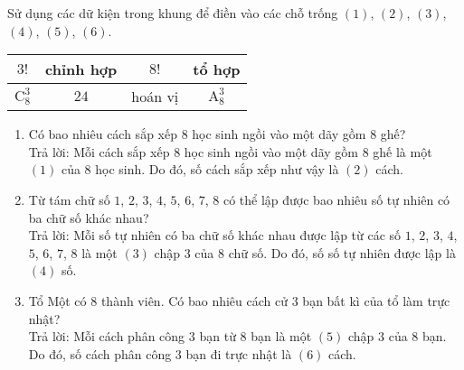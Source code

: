 
\begin{bt}[1,5 điểm]%
	Sử dụng các dữ kiện trong khung để điền vào các chỗ trống $(1)$, $(2)$, $(3)$, $(4)$, $(5)$, $(6)$.
\begin{center}
		\begin{tabular}{|c|c|c|c|}
		\hline
		$3!$ & chỉnh hợp & $8!$ & tổ hợp \\
		\hline
		$\mathrm{C}_8^3$ & $24$ & hoán vị & $\mathrm{A}_8^3$ \\
		\hline
	\end{tabular}
\end{center}
	\begin{enumerate}
		\item Có bao nhiêu cách sắp xếp $8$ học sinh ngồi vào một dãy gồm $8$ ghế?\\
		Trả lời: Mỗi cách sắp xếp $8$ học sinh ngồi vào một dãy gồm $8$ ghế là một $(1)$ của $8$ học sinh. Do đó, số cách sắp xếp như vậy là $(2)$ cách.
		\item Từ tám chữ số $1$, $2$, $3$, $4$, $5$, $6$, $7$, $8$ có thể lập được bao nhiêu số tự nhiên có ba chữ số khác nhau?\\
		Trả lời: Mỗi số tự nhiên có ba chữ số khác nhau được lập từ các số $1$, $2$, $3$, $4$, $5$, $6$, $7$, $8$ là một $(3)$ chập $3$ của $8$ chữ số. Do đó, số số tự nhiên được lập là $(4)$ số.
		\item Tổ Một có $8$ thành viên. Có bao nhiêu cách cử $3$ bạn bất kì của tổ làm trực nhật?\\
		Trả lời: Mỗi cách phân công $3$ bạn từ $8$ bạn là một $(5)$ chập $3$ của $8$ bạn. Do đó, số cách phân công $3$ bạn đi trực nhật là $(6)$ cách.
	\end{enumerate}
\end{bt}


